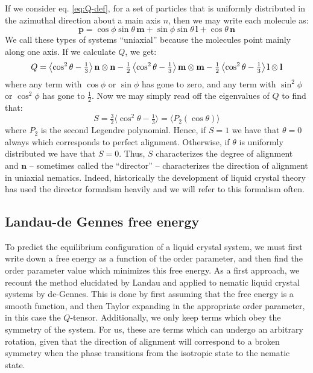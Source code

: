 \documentclass[reqno]{article}
\begin{document}
  If we consider eq. \eqref{eq:Q-def}, for a set of particles that is uniformly
  distributed in the azimuthal direction about a main axis $n$, then we may
  write each molecule as:
  \begin{equation}
    \mathbf{p}
    =
    \cos\phi \sin\theta \, \mathbf{m}
    + \sin\phi \sin\theta \, \mathbf{l}
    + \cos\theta \, \mathbf{n}
  \end{equation}
  We call these types of systems ``uniaxial'' because the molecules point mainly
  along one axis.
  If we calculate $Q$, we get:
  \begin{equation} \label{eq:uniaxial-Q-decomposition}
      Q
      = 
      \left< \cos^2 \theta - \tfrac13 \right> \mathbf{n} \otimes \mathbf{n}
      - \tfrac12 \left< \cos^2\theta - \tfrac13 \right> \mathbf{m} \otimes \mathbf{m}
      - \tfrac12 \left< \cos^2\theta - \tfrac13 \right> \mathbf{l} \otimes \mathbf{l}\\
  \end{equation}
  where any term with $\cos\phi$ or $\sin\phi$ has gone to zero, and any term
  with $\sin^2\phi$ or $\cos^2\phi$ has gone to $\tfrac12$.
  Now we may simply read off the eigenvalues of $Q$ to find that:
  \begin{equation}
    S
    = \tfrac32 \langle \cos^2 \theta - \tfrac13 \rangle
    = \langle P_2(\cos\theta) \rangle
  \end{equation}
  where $P_2$ is the second Legendre polynomial.
  Hence, if $S = 1$ we have that $\theta = 0$ always which corresponds to
  perfect alignment.
  Otherwise, if $\theta$ is uniformly distributed we have that $S = 0$.
  Thus, $S$ characterizes the degree of alignment and $\mathbf{n}$ -- sometimes called
  the ``director'' -- characterizes the direction of alignment in uniaxial
  nematics.
  Indeed, historically the development of liquid crystal theory has used the
  director formalism heavily and we will refer to this formalism often.
  
  \subsection{Landau-de Gennes free energy}
  To predict the equilibrium configuration of a liquid crystal system, we must
  first write down a free energy as a function of the order parameter, and then
  find the order parameter value which minimizes this free energy.
  As a first approach, we recount the method elucidated by Landau and applied to
  nematic liquid crystal systems by de-Gennes.
  This is done by first assuming that the free energy is a smooth function, and
  then Taylor expanding in the appropriate order parameter, in this case the
  $Q$-tensor.
  Additionally, we only keep terms which obey the symmetry of the system.
  For us, these are terms which can undergo an arbitrary rotation, given that
  the direction of alignment will correspond to a broken symmetry when the phase
  transitions from the isotropic state to the nematic state.
\end{document}
